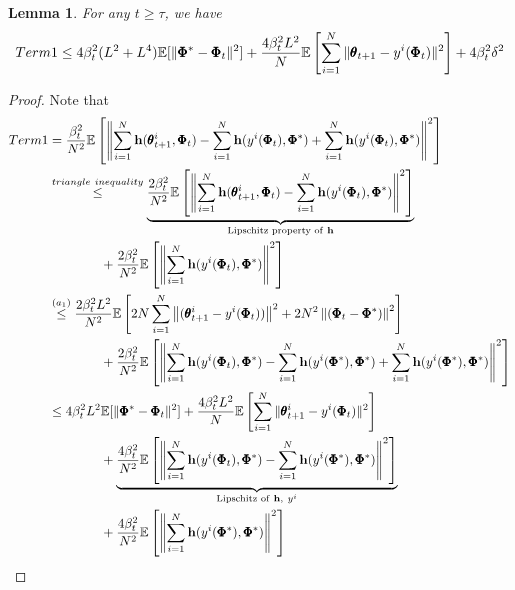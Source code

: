 \documentclass{article} %
\theoremstyle{plain}
\newtheorem{lemma}[theorem]{Lemma}
\theoremstyle{definition}
\theoremstyle{remark}
\begin{document}
{\begin{lemma}\label{lemma:term1}
For any $t\geq \tau$, we have
    \begin{align}
        \textnormal{Term 1}\leq  4\beta_t^2(L^2+L^4)\mathbb{E}[\|\pmb{\Phi}^*-\pmb{\Phi}_t\|^2]+\frac{4\beta_t^2L^2}{N}\mathbb{E}\left[\sum_{i=1}^N\|\pmb{\theta}_{t+1}-y^i(\pmb{\Phi}_t)\|^2\right]+4\beta_t^2\delta^2
    \end{align}
\end{lemma}
\begin{proof}
Note that 
\begin{align*}
    \textnormal{Term 1} &=\frac{\beta_t^2}{N^2}\mathbb{E}\left[\left\|\sum_{i=1}^N\bh(\pmb{\theta}_{t+1}^i, \pmb{\Phi}_t)-\sum_{i=1}^N\bh(y^i(\pmb{\Phi}_t), \pmb{\Phi}^*)+\sum_{i=1}^N\bh(y^i(\pmb{\Phi}_t), \pmb{\Phi}^*)\right\|^2\right]\allowdisplaybreaks\\
    &\overset{\textnormal{triangle~inequality}}{\leq} \underset{\text{Lipschitz property of}~ \bh}{\underbrace{\frac{2\beta_t^2}{N^2}\mathbb{E}\left[\left\|\sum_{i=1}^N\bh(\pmb{\theta}_{t+1}^i, \pmb{\Phi}_t)-\sum_{i=1}^N\bh(y^i(\pmb{\Phi}_t), \pmb{\Phi}^*)\right\|^2\right]}}\allowdisplaybreaks\\
    &\qquad\qquad+\frac{2\beta_t^2}{N^2}\mathbb{E}\left[\left\|\sum_{i=1}^N\bh(y^i(\pmb{\Phi}_t), \pmb{\Phi}^*)\right\|^2\right]\allowdisplaybreaks\\
    &\overset{(a_1)}{\leq} \frac{2\beta_t^2L^2}{N^2}\mathbb{E}\left[2N\sum_{i=1}^N\left\|(\pmb{\theta}_{t+1}^i-y^i(\pmb{\Phi}_t) )\right\|^2+2N^2\left\|(\pmb{\Phi}_t- \pmb{\Phi}^*)\right\|^2\right]\allowdisplaybreaks\\
    &\qquad\qquad+\frac{2\beta_t^2}{N^2}\mathbb{E}\left[\left\|\sum_{i=1}^N\bh(y^i(\pmb{\Phi}_t), \pmb{\Phi}^*)-\sum_{i=1}^N\bh(y^i(\pmb{\Phi}^{*}), \pmb{\Phi}^*)+\sum_{i=1}^N\bh(y^i(\pmb{\Phi}^{*}), \pmb{\Phi}^*)\right\|^2\right]\allowdisplaybreaks\\
    &\leq 4\beta_t^2L^2\mathbb{E}[\|\pmb{\Phi}^*-\pmb{\Phi}_t\|^2]+\frac{4\beta_t^2L^2}{N}\mathbb{E}\left[\sum_{i=1}^N\|\pmb{\theta}_{t+1}^i-y^i(\pmb{\Phi}_t)\|^2\right]\allowdisplaybreaks\\
    &\qquad\qquad+\underset{\text{Lipschitz of}~ \bh,~ y^i}{\underbrace{\frac{4\beta_t^2}{N^2}\mathbb{E}\left[\left\|\sum_{i=1}^N\bh(y^i(\pmb{\Phi}_t), \pmb{\Phi}^*)-\sum_{i=1}^N\bh(y^i(\pmb{\Phi}^{*}), \pmb{\Phi}^*)\right\|^2\right]}}\allowdisplaybreaks\\
    &\qquad\qquad+\frac{4\beta_t^2}{N^2}\mathbb{E}\left[\left\|\sum_{i=1}^N\bh(y^i(\pmb{\Phi}^{*}), \pmb{\Phi}^*)\right\|^2\right]\\

\end{align*}
\end{proof}}
\end{document}
